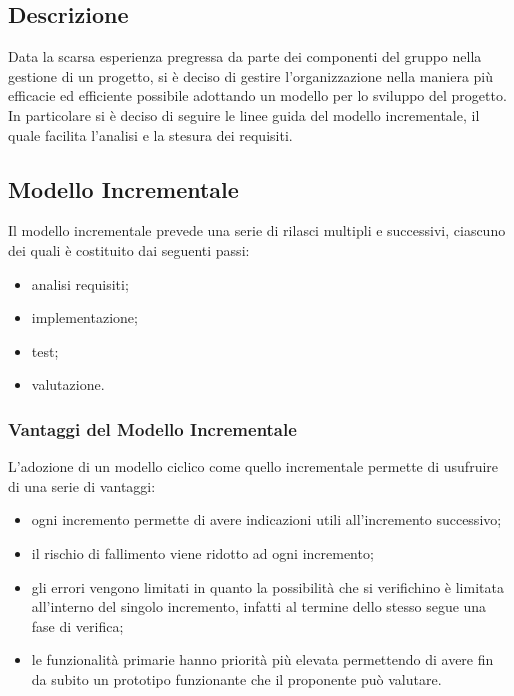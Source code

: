 \subsection{Descrizione}
Data la scarsa esperienza pregressa da parte dei componenti del gruppo nella gestione di un progetto, si è deciso di gestire l'organizzazione nella maniera più efficacie ed efficiente possibile adottando un modello  per lo sviluppo del progetto. In particolare si è deciso di seguire le linee guida del modello incrementale, il quale facilita l'analisi e la stesura dei requisiti. 
\subsection{Modello Incrementale}
Il modello incrementale prevede una serie di rilasci multipli e successivi, ciascuno dei quali è costituito dai seguenti passi: 
\begin{itemize}
    \item analisi requisiti;
    \item implementazione;
    \item test;
    \item valutazione.
\end{itemize}
\subsubsection{Vantaggi del Modello Incrementale}
L'adozione di un modello ciclico come quello incrementale permette di usufruire di una serie di vantaggi: 
\begin{itemize}
    \item ogni incremento permette di avere indicazioni utili all'incremento successivo;
    \item il rischio di fallimento viene ridotto ad ogni incremento;
    \item gli errori vengono limitati in quanto la possibilità che si verifichino è limitata all'interno del singolo incremento, infatti al termine dello stesso segue una fase di verifica;
    \item le funzionalità primarie hanno priorità più elevata permettendo di avere fin da subito un prototipo funzionante che il proponente può valutare.
\end{itemize}
\newpage